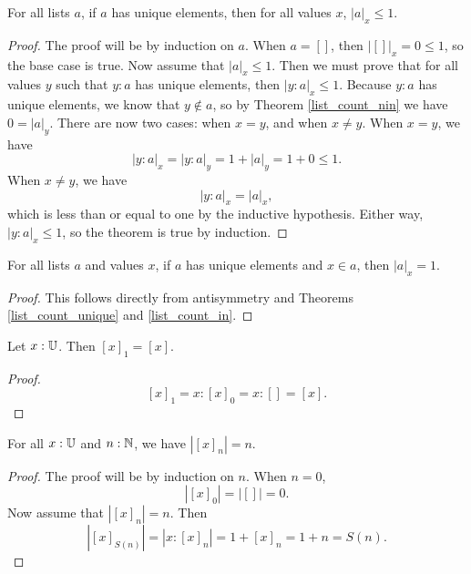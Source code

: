 \documentclass[../../math.tex]{subfiles}
\begin{document}
\begin{theorem} \label{list_count_unique}
    For all lists $a$, if $a$ has unique elements, then for all values $x$,
    $|a|_x \leq 1$.
\end{theorem}
\begin{proof}
    The proof will be by induction on $a$.  When $a = []$, then $|[]|_x = 0 \leq
    1$, so the base case is true.  Now assume that $|a|_x \leq 1$.  Then we must
    prove that for all values $y$ such that $y : a$ has unique elements, then
    $|y : a|_x \leq 1$.  Because $y : a$ has unique elements, we know that $y
    \notin a$, so by Theorem \ref{list_count_nin} we have $0 = |a|_y$.  There
    are now two cases: when $x = y$, and when $x \neq y$.  When $x = y$, we have
    \[
        |y : a|_x = |y : a|_y = 1 + |a|_y = 1 + 0 \leq 1.
    \]
    When $x \neq y$, we have
    \[
        |y : a|_x = |a|_x,
    \]
    which is less than or equal to one by the inductive hypothesis.  Either way,
    $|y : a|_x \leq 1$, so the theorem is true by induction.
\end{proof}

\begin{theorem} \label{list_count_in_unique}
    For all lists $a$ and values $x$, if $a$ has unique elements and $x \in a$,
    then $|a|_x = 1$.
\end{theorem}
\begin{proof}
    This follows directly from antisymmetry and Theorems \ref{list_count_unique}
    and \ref{list_count_in}.
\end{proof}

\begin{theorem} \label{list_constant_one}
    Let $x : \mathbb{U}$.  Then $[x]_1 = [x]$.
\end{theorem}
\begin{proof}
    \[
        [x]_1 = x : [x]_0 = x : [] = [x].
    \]
\end{proof}

\begin{theorem} \label{list_count_constant}
    For all $x : \mathbb{U}$ and $n : \mathbb{N}$, we have $|[x]_n| = n$.
\end{theorem}
\begin{proof}
    The proof will be by induction on $n$.  When $n = 0$,
    \[
        |[x]_0| = |[]| = 0.
    \]
    Now assume that $|[x]_n| = n$.  Then
    \[
        |[x]_{S(n)}| = |x : [x]_n| = 1 + [x]_n = 1 + n = S(n).
    \]
\end{proof}
\end{document}
